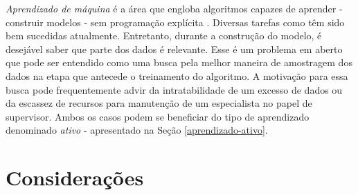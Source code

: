 \textit{Aprendizado de máquina} é a área que engloba algoritmos capazes de
aprender - construir modelos - sem
programação explícita \citep{journals/cacm/Valiant84}.
Diversas tarefas como 
têm sido bem sucedidas atualmente.
Entretanto, durante a construção do modelo, é desejável saber
que parte dos dados é relevante.
Esse é um problema em aberto que pode ser entendido como uma busca
pela melhor maneira de amostragem dos dados
na etapa que antecede o treinamento do algoritmo.
A motivação para essa busca pode frequentemente advir
da intratabilidade de um excesso de dados
ou da escassez de recursos para manutenção de um especialista no
papel de supervisor.
Ambos os casos podem se beneficiar do tipo de
aprendizado denominado \textit{ativo} - apresentado
na Seção \ref{aprendizado-ativo}.

 
 
 
\section{Considerações}